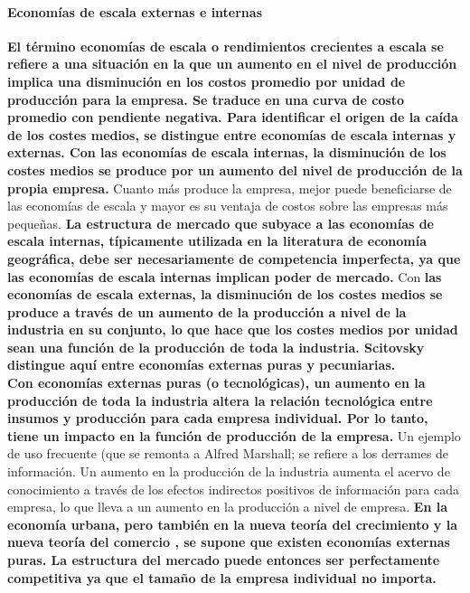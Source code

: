 \paragraph{Economías de escala externas e internas}
\textbf{El término economías de escala o rendimientos crecientes a escala se refiere a una situación en la que un aumento en el nivel de producción implica una disminución en los costos promedio por unidad de producción para la empresa. Se traduce en una curva de costo promedio con pendiente negativa. Para identificar el origen de la caída de los costes medios, se distingue entre economías de escala internas y externas. Con las economías de escala internas, la disminución de los costes medios se produce por un aumento del nivel de producción de la propia empresa.} Cuanto más produce la empresa, mejor puede beneficiarse de las economías de escala y mayor es su ventaja de costos sobre las empresas más pequeñas. \textbf{La estructura de mercado que subyace a las economías de escala internas, típicamente utilizada en la literatura de economía geográfica, debe ser necesariamente de competencia imperfecta, ya que las economías de escala internas implican poder de mercado.} Con \textbf{las economías de escala externas, la disminución de los costes medios se produce a través de un aumento de la producción a nivel de la industria en su conjunto, lo que hace que los costes medios por unidad sean una función de la producción de toda la industria. Scitovsky distingue aquí entre economías externas puras y pecuniarias.}\\
\textbf{Con economías externas puras (o tecnológicas), un aumento en la producción de toda la industria altera la relación tecnológica entre insumos y producción para cada empresa individual. Por lo tanto, tiene un impacto en la función de producción de la empresa.} Un ejemplo de uso frecuente (que se remonta a Alfred Marshall; se refiere a los derrames de información. Un aumento en la producción de la industria aumenta el acervo de conocimiento a través de los efectos indirectos positivos de información para cada empresa, lo que lleva a un aumento en la producción a nivel de empresa. \textbf{En la economía urbana, pero también en la nueva teoría del crecimiento  y la nueva teoría del comercio , se supone que existen economías externas puras. La estructura del mercado puede entonces ser perfectamente competitiva ya que el tamaño de la empresa individual no importa.}\\
